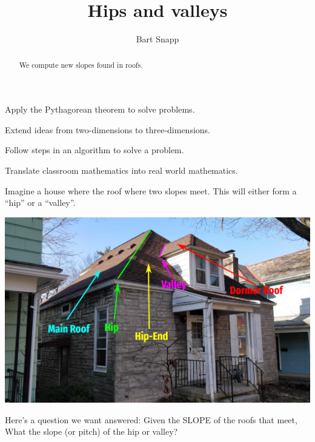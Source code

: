 \documentclass[hints,nooutcomes,noauthor,handout]{ximera}
\title{Hips and valleys}
\author{Bart Snapp}
\begin{document}
\begin{abstract}
  We compute new slopes found in roofs.
\end{abstract}
\maketitle


\begin{listOutcomes}
\item Apply the Pythagorean theorem to solve problems.
\item Extend ideas from two-dimensions to three-dimensions.
\item Follow steps in an algorithm to solve a problem.
\item Translate classroom mathematics into real world mathematics.
\end{listOutcomes}


Imagine a house where the roof where two slopes meet. This will either
form a ``hip'' or a ``valley''.
\begin{center}
  \includegraphics[width=.8\textwidth]{house.jpg}
\end{center}
Here's a question we want answered: Given the SLOPE of the roofs that
meet, What the slope (or pitch) of the hip or valley?



\mynewpage

 
\end{document}
